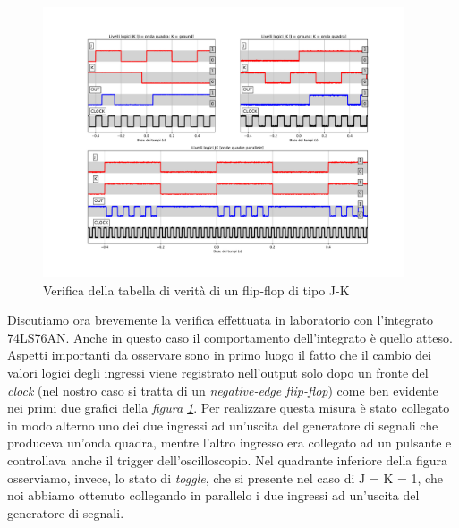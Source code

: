 \documentclass[journal]{IEEEtran}
\begin{document}
\begin{figure}[t]%
\centering
\includegraphics[width=0.95\textwidth]{analysis/output/JK-truth.pdf}
\caption{Verifica della tabella di verità di un flip-flop di tipo J-K}
\label{fig:jk-truth}
\end{figure}
Discutiamo ora brevemente la verifica effettuata in laboratorio con l'integrato 74LS76AN.
Anche in questo caso il comportamento dell'integrato è quello atteso. Aspetti importanti da osservare sono in primo luogo il fatto che il cambio dei valori logici degli ingressi viene registrato nell'output solo dopo un fronte del \textit{clock} (nel nostro caso si tratta di un \textit{negative-edge flip-flop}) come ben evidente nei primi due grafici della \textit{figura \ref{fig:jk-truth}}. Per realizzare questa misura è stato collegato in modo alterno uno dei due ingressi ad un'uscita del generatore di segnali che produceva un'onda quadra, mentre l'altro ingresso era collegato ad un pulsante e controllava anche il trigger dell'oscilloscopio. 
Nel quadrante inferiore della figura osserviamo, invece, lo stato di \textit{toggle}, che si presente nel caso di J = K = 1, che noi abbiamo ottenuto collegando in parallelo i due ingressi ad un'uscita del generatore di segnali.
\end{document}
